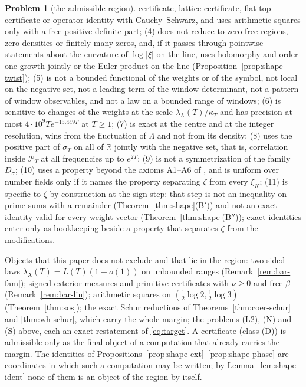 \documentclass[11pt]{amsart}
\theoremstyle{definition}
\newtheorem{problem}[theorem]{Problem}
\theoremstyle{remark}
\newcommand{\R}{\mathbb R}
\newcommand{\PT}{\mathcal P_T}
\newcommand{\lamA}{\lambda_{\mathrm A}(T)}
\newcommand{\sT}{\sigma_T}
\begin{document}
\begin{enumerate}
\begin{problem}[the admissible region]
certificate, lattice certificate, flat-top certificate or operator identity with Cauchy--Schwarz, and uses arithmetic squares only with a
free positive definite part; (4) does not reduce to zero-free regions, zero densities or finitely many zeros, and, if it passes through
pointwise statements about the curvature of $\log|\xi|$ on the line, uses holomorphy and order-one growth jointly or the Euler product on
the line (Proposition~\ref{prop:shape-twist}); (5) is not a bounded functional of the weights or of the symbol, not local on the
negative set, not a leading term of the window determinant, not a pattern of window observables, and not a law on a bounded range of
windows; (6) is sensitive to changes of the weights at the scale $\lamA/\kappa_T$ and has precision at most $4\cdot10^9Te^{-15.449T}$
at $T\ge1$; (7) is exact at the centre and at the integer resolution, wins from the fluctuation of $\Lambda$ and not from its density;
(8) uses the positive part of $\sT$ on all of $\R$ jointly with the negative set, that is, correlation inside $\PT$ at all frequencies
up to $e^{2T}$; (9) is not a symmetrization of the family $D_\sigma$; (10) uses a property beyond the axioms A1--A6 of \cite{Paper46},
and is uniform over number fields only if it names the property separating $\zeta$ from every $\xi_K$; (11) is specific to $\zeta$ by
construction at the sign step: that step is not an inequality on prime sums with a remainder (Theorem~\ref{thm:shape}(B$'$)) and not an exact
identity valid for every weight vector (Theorem~\ref{thm:shape}(B$''$)); exact identities enter only as bookkeeping beside a property that
separates $\zeta$ from the modifications.
\end{problem}
Objects that this paper does not exclude and that lie in the region: two-sided laws $\lamA=L(T)(1+o(1))$ on unbounded ranges
(Remark~\ref{rem:bar-fam}); signed exterior measures and primitive certificates with $\nu\ge0$ and free $\beta$ (Remark~\ref{rem:bar-lin});
arithmetic squares on $(\frac12\log2,\frac12\log3)$ (Theorem~\ref{thm:sos}); the exact Schur reductions of Theorems~\ref{thm:coer-schur}
and \ref{thm:wh-schur}, which carry the whole margin; the problems (L2), (N) and (S) above, each an exact restatement of
\eqref{eq:target}. A certificate (class (D)) is admissible only as the final object of a computation that already carries the margin.
The identities of Propositions~\ref{prop:shape-ext}--\ref{prop:shape-phase} are coordinates in which such a computation may be written; by
Lemma~\ref{lem:shape-ident} none of them is an object of the region by itself.
\end{enumerate}
\end{document}
